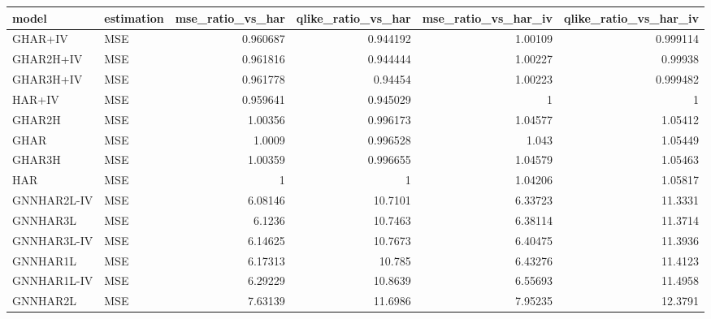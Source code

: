 \begin{tabular}{llrrrr}
\toprule
model & estimation & mse_ratio_vs_har & qlike_ratio_vs_har & mse_ratio_vs_har_iv & qlike_ratio_vs_har_iv \\
\midrule
GHAR+IV & MSE & 0.960687 & 0.944192 & 1.00109 & 0.999114 \\
GHAR2H+IV & MSE & 0.961816 & 0.944444 & 1.00227 & 0.99938 \\
GHAR3H+IV & MSE & 0.961778 & 0.94454 & 1.00223 & 0.999482 \\
HAR+IV & MSE & 0.959641 & 0.945029 & 1 & 1 \\
GHAR2H & MSE & 1.00356 & 0.996173 & 1.04577 & 1.05412 \\
GHAR & MSE & 1.0009 & 0.996528 & 1.043 & 1.05449 \\
GHAR3H & MSE & 1.00359 & 0.996655 & 1.04579 & 1.05463 \\
HAR & MSE & 1 & 1 & 1.04206 & 1.05817 \\
GNNHAR2L-IV & MSE & 6.08146 & 10.7101 & 6.33723 & 11.3331 \\
GNNHAR3L & MSE & 6.1236 & 10.7463 & 6.38114 & 11.3714 \\
GNNHAR3L-IV & MSE & 6.14625 & 10.7673 & 6.40475 & 11.3936 \\
GNNHAR1L & MSE & 6.17313 & 10.785 & 6.43276 & 11.4123 \\
GNNHAR1L-IV & MSE & 6.29229 & 10.8639 & 6.55693 & 11.4958 \\
GNNHAR2L & MSE & 7.63139 & 11.6986 & 7.95235 & 12.3791 \\
\bottomrule
\end{tabular}
